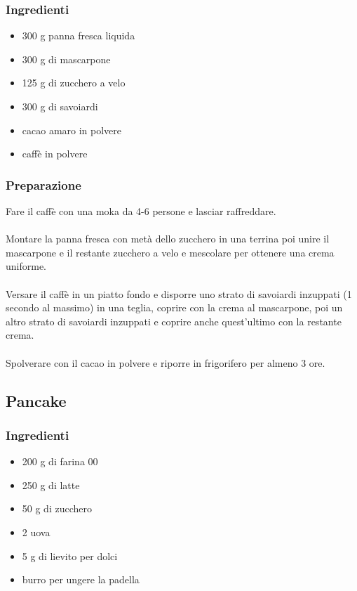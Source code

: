 \documentclass[12pt, a4paper]{article}
\begin{document}
\subsubsection{Ingredienti}
\begin{itemize}
\item   300 g panna fresca liquida
\item	300 g di mascarpone
\item	125 g di zucchero a velo
\item	300 g di savoiardi
\item	cacao amaro in polvere
\item	caffè in polvere
\end{itemize}

\subsubsection{Preparazione}
	Fare il caffè con una moka da 4-6 persone e lasciar raffreddare.\\\\
	Montare la panna fresca con metà dello zucchero in una terrina poi
	unire il mascarpone e il restante zucchero a velo e mescolare per ottenere
	una crema uniforme.\\\\
	Versare il caffè in un piatto fondo e disporre uno strato di savoiardi
	inzuppati (1 secondo al massimo) in una teglia, coprire con la crema
	al mascarpone, poi un altro strato di savoiardi inzuppati e coprire
	anche quest'ultimo con la restante crema.\\\\
	Spolverare con il cacao in polvere e riporre in frigorifero per almeno 3 ore.	
\clearpage

\subsection{Pancake}

\subsubsection{Ingredienti}
\begin{itemize}
\item   200 g di farina 00 
\item	250 g di latte
\item	50 g di zucchero
\item	2 uova
\item	5 g di lievito per dolci
\item	burro per ungere la padella
\end{itemize}
\end{document}
